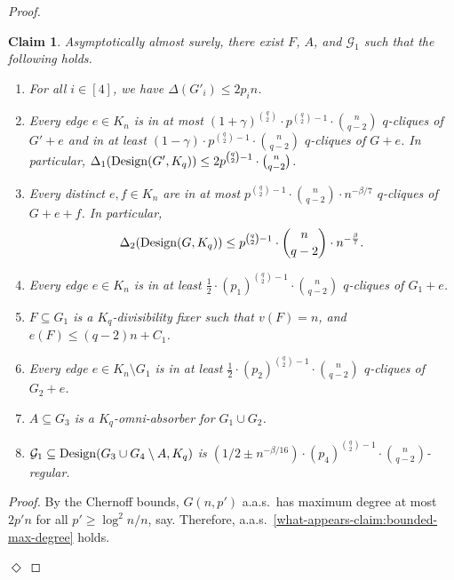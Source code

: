 \documentclass[11pt]{article}
\numberwithin{equation}{section}
\newcounter{i}
\theoremstyle{plain}
\newtheorem{claim}{Claim}[thm]
\newenvironment{proofclaim}[1][]%
{\noindent \emph{Proof.} {}{#1}{}}{\hfill
	$\Diamond$\vspace{1em}}
\theoremstyle{plain} %
\theoremstyle{definition}
\newcommand{\cG}{\mathcal{G}}
\newcommand{\aas}{a.a.s.\ }
\begin{document}
\begin{proof}
\begin{claim}
  Asymptotically almost surely, there exist $F$, $A$, and $\cG_1$ such that the following holds.
    \begin{enumerate}[label=(\alph*)]
    \item\label{what-appears-claim:bounded-max-degree} For all $i\in [4]$, we have $\Delta(G'_i) \leq 2p_in$.\label{what-appears-claim:first}
    \item\label{what-appears-claim:reserves-degree-upper} Every edge $e \in K_n$ is in at most $(1 + \gamma)^{\binom{q}{2}}\cdot p^{\binom{q}{2}-1}\cdot\binom{n}{q-2}$ $q$-cliques of $G' + e$ and in at least $(1 - \gamma)\cdot p^{\binom{q}{2}-1}\cdot \binom{n}{q - 2}$ $q$-cliques of $G + e$.
    In particular, $\Delta_1({\rm Design}(G', K_q)) \leq 2p^{\binom{q}{2}-1}\cdot\binom{n}{q-2}$.
    \item\label{what-appears-claim:reserves-codegree} Every distinct $e,f \in K_n$ are in at most $p^{\binom{q}{2} - 1}\cdot\binom{n}{q - 2}\cdot n^{-\beta / 7}$ $q$-cliques of $G + e + f$.
    In particular, 
    \begin{equation*}
        \Delta_2({\rm Design}(G, K_q)) \leq p^{\binom{q}{2}-1}\cdot\binom{n}{q-2}\cdot n^{-\frac{\beta}{7}}.
    \end{equation*}
    \item\label{what-appears-claim:reserves-degree-lower2} Every edge $e \in K_n$ is in at least $\frac{1}{2}\cdot (p_1)^{\binom{q}{2}-1}\cdot \binom{n}{q - 2}$ $q$-cliques of $G_1 + e$.
    \item\label{what-appears-claim:div-fixer} $F \subseteq G_1$ is a $K_q$-divisibility fixer such that $v(F) = n$, and $e(F) \leq (q - 2)n + C_1$. 
    \item\label{what-appears-claim:reserves-degree-lower} Every edge $e \in K_n \setminus G_1$ is in at least $\frac{1}{2}\cdot (p_2)^{\binom{q}{2}-1}\cdot \binom{n}{q - 2}$ $q$-cliques of $G_2 + e$.
    \item\label{what-appears-claim:omni-absorber} $A \subseteq G_3$ is a $K_q$-omni-absorber for $G_1 \cup G_2$.
    \item\label{what-appears-claim:boosted-design-hypergraph} $\cG_1 \subseteq {\rm Design}(G_3 \cup G_4 \setminus A, K_q)$ is $(1/2 \pm n^{-\beta / 16})\cdot (p_4)^{\binom{q}{2}-1}\cdot \binom{n}{q - 2}$-regular.
    \label{what-appears-claim:last}
\end{enumerate}  
\end{claim}
\begin{proofclaim}
  By the Chernoff bounds, $G(n, p')$ \aas has maximum degree at most $2p'n$ for all $p' \geq \log^2 n / n$, say. Therefore, \aas \ref{what-appears-claim:bounded-max-degree} holds.

\end{proofclaim}
\end{proof}
\end{document}
